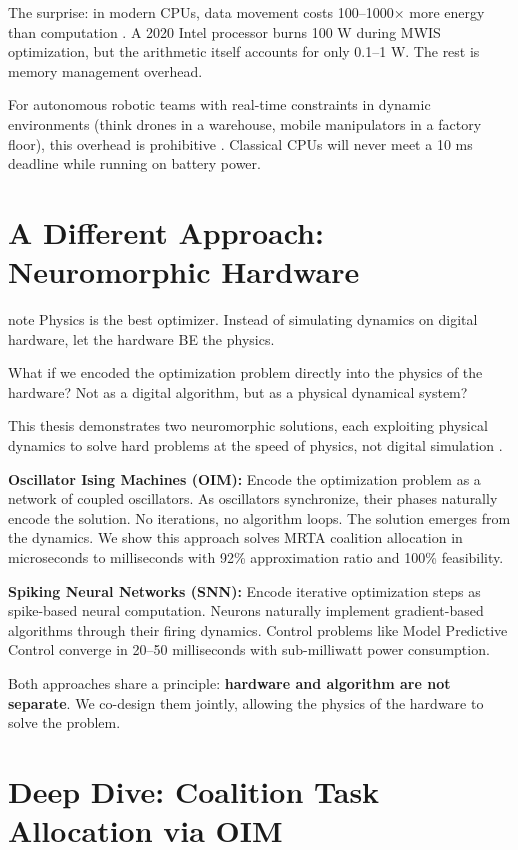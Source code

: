 The surprise: in modern CPUs, data movement costs 100--1000$\times$ more energy than computation \cite{Shalf2014}. A 2020 Intel processor burns 100 W during MWIS optimization, but the arithmetic itself accounts for only 0.1--1 W. The rest is memory management overhead.

For autonomous robotic teams with real-time constraints in dynamic environments (think drones in a warehouse, mobile manipulators in a factory floor), this overhead is prohibitive \cite{Siciliano2016}. Classical CPUs will never meet a 10 ms deadline while running on battery power.

\section{A Different Approach: Neuromorphic Hardware}

\begin{block}{note}
Physics is the best optimizer. Instead of simulating dynamics on digital hardware, let the hardware BE the physics.
\end{block}


What if we encoded the optimization problem directly into the physics of the hardware? Not as a digital algorithm, but as a physical dynamical system?

This thesis demonstrates two neuromorphic solutions, each exploiting physical dynamics to solve hard problems at the speed of physics, not digital simulation \cite{Furber2016, Indiveri2015}.

\textbf{Oscillator Ising Machines (OIM):} Encode the optimization problem as a network of coupled oscillators. As oscillators synchronize, their phases naturally encode the solution. No iterations, no algorithm loops. The solution emerges from the dynamics. We show this approach solves MRTA coalition allocation in microseconds to milliseconds with 92\% approximation ratio and 100\% feasibility.

\textbf{Spiking Neural Networks (SNN):} Encode iterative optimization steps as spike-based neural computation. Neurons naturally implement gradient-based algorithms through their firing dynamics. Control problems like Model Predictive Control converge in 20--50 milliseconds with sub-milliwatt power consumption.

Both approaches share a principle: \textbf{hardware and algorithm are not separate}. We co-design them jointly, allowing the physics of the hardware to solve the problem.

\section{Deep Dive: Coalition Task Allocation via OIM}


